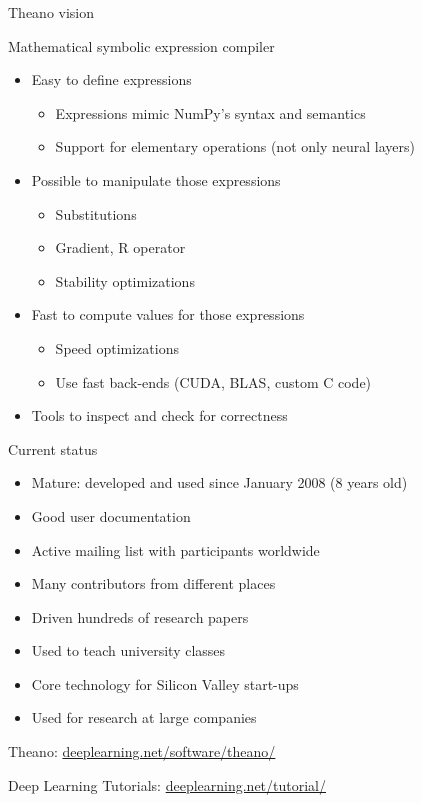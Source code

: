 \documentclass[a4paper,9pt]{beamer}
\begin{document}
\begin{frame}{Theano vision}

  Mathematical symbolic expression compiler

  \begin{itemize}
    \item Easy to define expressions
      \begin{itemize}
        \item Expressions mimic NumPy's syntax and semantics
        \item Support for elementary operations (not only neural layers)
      \end{itemize}
    \item Possible to manipulate those expressions
      \begin{itemize}
        \item Substitutions
        \item Gradient, R operator
        \item Stability optimizations
      \end{itemize}
    \item Fast to compute values for those expressions
      \begin{itemize}
        \item Speed optimizations
        \item Use fast back-ends (CUDA, BLAS, custom C code)
      \end{itemize}
    \item Tools to inspect and check for correctness
  \end{itemize}
\end{frame}

\begin{frame}[fragile]{Current status}
  \begin{itemize}
    \item Mature: developed and used since January 2008 (8 years old)
    \item Good user documentation
    \item Active mailing list with participants worldwide
    \item Many contributors from different places
    \item Driven hundreds of research papers
    \item Used to teach university classes
    \item Core technology for Silicon Valley start-ups
    \item Used for research at large companies
  \end{itemize}
  Theano: \url{deeplearning.net/software/theano/}

  Deep Learning Tutorials: \url{deeplearning.net/tutorial/}
\end{frame}
\end{document}

